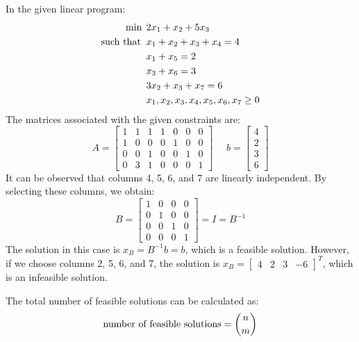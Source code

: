 \begin{example}
    In the given linear program:
    \begin{align*}
        \min                      \:&\: 2x_1+x_2+5x_3          \\
        \textnormal{such that }     &\: x_1+x_2+x_3+x_4=4  \\
                                    &\: x_1+x_5=2  \\
                                    &\: x_3+x_6=3 \\
                                    &\: 3x_2+x_3+x_7=6  \\
                                    &\: x_1,x_2,x_3,x_4,x_5,x_6,x_7 \geq 0
    \end{align*}
    The matrices associated with the given constraints are:
    \[
    A=
    \begin{bmatrix}
        1 & 1 & 1 & 1 & 0 & 0 & 0 \\
        1 & 0 & 0 & 0 & 1 & 0 & 0 \\
        0 & 0 & 1 & 0 & 0 & 1 & 0 \\
        0 & 3 & 1 & 0 & 0 & 0 & 1
    \end{bmatrix}
    \:\:\:\:\:\:
    b=
    \begin{bmatrix}
        4 \\
        2 \\
        3 \\
        6
    \end{bmatrix}
    \]
    It can be observed that columns 4, 5, 6, and 7 are linearly independent. 
    By selecting these columns, we obtain:
    \[
    B= 
    \begin{bmatrix}
        1 & 0 & 0 & 0 \\
        0 & 1 & 0 & 0 \\
        0 & 0 & 1 & 0 \\
        0 & 0 & 0 & 1
    \end{bmatrix}
    =I=B^{-1}
    \]
    The solution in this case is $x_B=B^{-1}b=b$, which is a feasible solution.
    However, if we choose columns 2, 5, 6, and 7, the solution is $x_B=\begin{bmatrix} 4 & 2 & 3 & -6 \end{bmatrix}^T$, which is an infeasible solution.
\end{example}
The total number of feasible solutions can be calculated as:
\[\textnormal{number of feasible solutions}=\binom{n}{m}\]